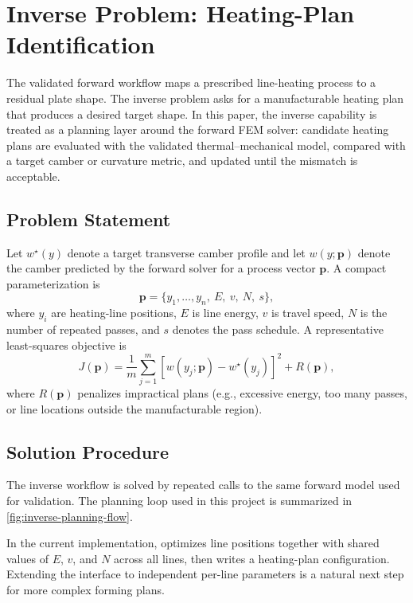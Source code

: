 \section{Inverse Problem: Heating-Plan Identification}
\label{sec:reverse-problem}

The validated forward workflow maps a prescribed line-heating process to a residual plate shape. The inverse problem asks for a manufacturable heating plan that produces a desired target shape. In this paper, the inverse capability is treated as a planning layer around the forward FEM solver: candidate heating plans are evaluated with the validated thermal--mechanical model, compared with a target camber or curvature metric, and updated until the mismatch is acceptable.

\subsection{Problem Statement}
Let $w^{\star}(y)$ denote a target transverse camber profile and let $w(y;\mathbf{p})$ denote the camber predicted by the forward solver for a process vector $\mathbf{p}$. A compact parameterization is
\begin{equation}
\mathbf{p} = \{y_1,\ldots,y_n,\ E,\ v,\ N,\ s\},
\end{equation}
where $y_i$ are heating-line positions, $E$ is line energy, $v$ is travel speed, $N$ is the number of repeated passes, and $s$ denotes the pass schedule. A representative least-squares objective is
\begin{equation}
J(\mathbf{p}) = \frac{1}{m}\sum_{j=1}^{m}\left[w(y_j;\mathbf{p}) - w^{\star}(y_j)\right]^2 + R(\mathbf{p}),
\end{equation}
where $R(\mathbf{p})$ penalizes impractical plans (e.g., excessive energy, too many passes, or line locations outside the manufacturable region).

\subsection{Solution Procedure}
The inverse workflow is solved by repeated calls to the same forward model used for validation. The planning loop used in this project is summarized in \cref{fig:inverse-planning-flow}.

In the current implementation,  optimizes line positions together with shared values of $E$, $v$, and $N$ across all lines, then writes a heating-plan configuration. Extending the interface to independent per-line parameters is a natural next step for more complex forming plans.

